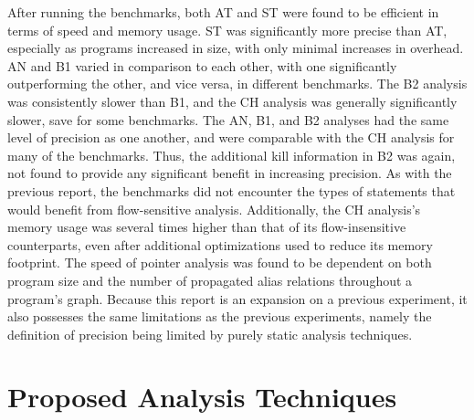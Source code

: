 After running the benchmarks, both AT and ST were found to be efficient in terms of speed and memory usage. ST was significantly more precise than AT, especially as programs increased in size, with only minimal increases in overhead. AN and B1 varied in comparison to each other, with one significantly outperforming the other, and vice versa, in different benchmarks. The B2 analysis was consistently slower than B1, and the CH analysis was generally significantly slower, save for some benchmarks. The AN, B1, and B2 analyses had the same level of precision as one another, and were comparable with the CH analysis for many of the benchmarks. Thus, the additional kill information in B2 was again, not found to provide any significant benefit in increasing precision. As with the previous report, the benchmarks did not encounter the types of statements that would benefit from flow-sensitive analysis. Additionally, the CH analysis's memory usage was several times higher than that of its flow-insensitive counterparts, even after additional optimizations used to reduce its memory footprint. The speed of pointer analysis was found to be dependent on both program size and the number of propagated alias relations throughout a program's graph. Because this report is an expansion on a previous experiment, it also possesses the same limitations as the previous experiments, namely the definition of precision being limited by purely static analysis techniques.

\section{Proposed Analysis Techniques}

